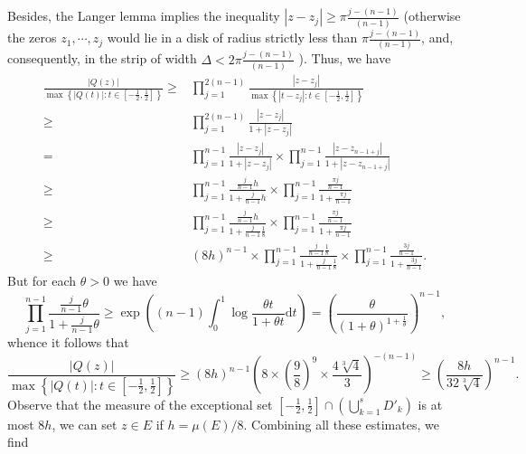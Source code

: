 Besides, the Langer lemma implies the inequality $\left| z-z_j \right| \ge \pi \frac{j-(n-1)}{(n-1)}$ (otherwise the zeros $z_1,\cdots,z_j$ would lie in a disk of radius strictly less than $\pi \frac{j-(n-1)}{(n-1)}$, and, consequently, in the strip of width $\Delta<2\pi \frac{j-(n-1)}{(n-1)}$ ). Thus, we have
\begin{equation*}
  \begin{aligned}
    \frac{\left| Q(z) \right| }{\max\left\{ \left| Q(t) \right| :t\in \left[ -\frac{1}{2},\frac{1}{2} \right]  \right\} }\ge  & \prod_{j=1}^{2(n-1)} \frac{\left| z-z_j \right| }{\max\left\{ \left| t-z_j \right| :t\in \left[ -\frac{1}{2},\frac{1}{2} \right]  \right\} }\\
    \ge  & \prod_{j=1}^{2(n-1)} \frac{\left| z-z_j \right| }{1+\left| z-z_j \right| }\\
    = & \prod_{j=1}^{n-1} \frac{\left| z-z_j \right| }{1+\left| z-z_j \right| }\times \prod_{j=1}^{n-1} \frac{\left| z-z_{n-1+j} \right| }{1+\left| z-z_{n-1+j} \right| }\\
    \ge  & \prod_{j=1}^{n-1} \frac{\frac{j}{n-1}h}{1+\frac{j}{n-1}h}\times \prod_{j=1}^{n-1} \frac{ \frac{\pi j}{n-1}}{1+ \frac{\pi j}{n-1}}\\ 
    \ge  & \prod_{j=1}^{n-1} \frac{\frac{j}{n-1}h}{1+\frac{j}{n-1} \frac{1}{8}}\times \prod_{j=1}^{n-1} \frac{ \frac{\pi j}{n-1}}{1+ \frac{\pi j}{n-1}}\\
    \ge   & (8h)^{n-1} \times \prod_{j=1}^{n-1} \frac{\frac{j}{n-1} \frac{1}{8}}{1+\frac{j}{n-1} \frac{1}{8}}\times \prod_{j=1}^{n-1} \frac{ \frac{3 j}{n-1}}{1+ \frac{3 j}{n-1}}.
  \end{aligned}
\end{equation*}
But for each $\theta>0$ we have 
\[
  \prod_{j=1}^{n-1} \frac{\frac{j}{n-1}\theta}{1+ \frac{j}{n-1}\theta}\ge  \exp\left( (n-1)\int_0^{1}\log \frac{\theta t}{1+\theta t}\mathrm{d}t \right) =\left( \frac{\theta}{(1+\theta)^{1+\frac{1}{\theta}}} \right) ^{n-1},
\] 
whence it follows that 
\[
  \frac{\left| Q(z) \right| }{\max\left\{ \left| Q(t) \right| :t\in \left[ -\frac{1}{2},\frac{1}{2} \right]  \right\} }\ge  (8h)^{n-1}\left( 8\times \left( \frac{9}{8} \right) ^{9}\times \frac{4\sqrt[3]{4} }{3} \right) ^{-(n-1)}\ge \left( \frac{8h}{32\sqrt[3]{4} } \right)^{n-1}. 
\]
Observe that the measure of the exceptional set $\left[ -\frac{1}{2},\frac{1}{2} \right] \cap \left( \bigcup_{k=1} ^{s}D'_k \right) $ is at most $8h$, we can set $z\in  E$ if $h= \mu(E) /8$. Combining all these estimates, we find
